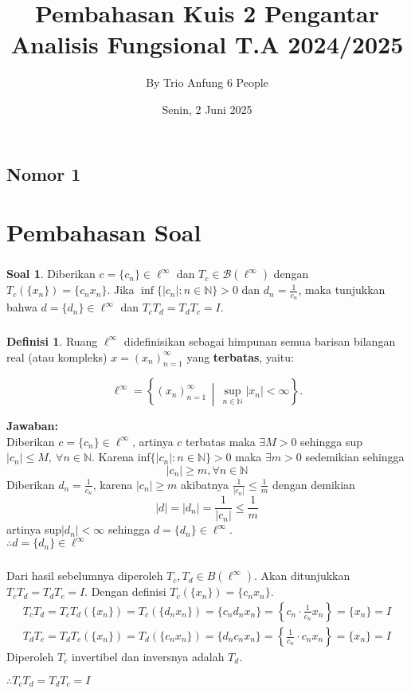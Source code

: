 \documentclass[aspectratio=169]{beamer}
\date{Senin, 2 Juni 2025}
\title[Pengantar Analisis Fungsional]{Pembahasan Kuis 2 Pengantar Analisis Fungsional T.A 2024/2025}
\author[Trio Anfung]{By Trio Anfung 6 People}
\institute[Matematika ITS]{Departemen Matematika\\ Institut Teknologi Sepuluh Nopember}
\theoremstyle{definition}
\newtheorem{definisi}{Definisi}
\newtheorem{soal}{Soal}
\begin{document}
\begin{frame}
  \titlepage
\end{frame}

\subsection{Nomor 1}
\section{Pembahasan Soal}
\begin{frame}
  \frametitle{\insertsection}
  \begin{soal}
    Diberikan $c = \{c_n\} \in \ell^\infty$ dan $T_c \in \mathcal{B}(\ell^\infty)$ dengan $T_c(\{x_n\}) = \{c_n x_n\}$. Jika $\inf\{|c_n| : n \in \mathbb{N}\} > 0$ dan $d_n = \frac{1}{c_n}$, maka tunjukkan bahwa $d = \{d_n\} \in \ell^\infty$ dan $T_c T_d = T_d T_c = I$.
  \end{soal}

\end{frame}


\begin{frame}
  \frametitle{\insertsection}
  \framesubtitle{\insertsubsection}
  \begin{definisi}
    Ruang \( \ell^\infty \) didefinisikan sebagai himpunan semua barisan bilangan real (atau kompleks) \( x = (x_n)_{n=1}^\infty \) yang \textbf{terbatas}, yaitu:

    \[
      \ell^\infty = \left\{ (x_n)_{n=1}^\infty \,\middle|\, \sup_{n \in \mathbb{N}} |x_n| < \infty \right\}.
    \]

  \end{definisi}
  \textbf{Jawaban:}\\
  Diberikan $c = \{c_n\} \in \ell ^\infty$, artinya $c$ terbatas maka  $\exists M>0$ sehingga sup$|c_n| \leq M , \ \forall n \in \mathbb{N}$. Karena inf$\{|c_n| : n \in \mathbb{N}\}>0$ maka $\exists  m>0$ sedemikian sehingga
  \[|c_n| \ge m ,\forall n \in \mathbb{N}\]
  Diberikan $d_n = \frac{1}{c_n}$, karena $|c_n| \ge m$ akibatnya $\frac{1}{|c_n|} \leq \frac{1}{m}$ dengan demikian
  \[|d|  = |d_n|=\frac{1}{|c_n|}\leq \frac{1}{m}\]
  artinya sup$|d_n|<\infty$ sehingga $d=\{d_n\}\in \ell^\infty$.\\

  $\therefore d=\{d_n\}\in \ell^\infty$
\end{frame}

\begin{frame}
  \frametitle{\insertsection}
  \framesubtitle{\insertsubsection}
  Dari hasil sebelumnya diperoleh $T_c,T_d \in B(\ell^\infty)$. Akan ditunjukkan $T_cT_d = T_dT_c = I$. Dengan definisi $T_c(\{x_n\}) = \{c_nx_n\}$.
  \begin{align*}
    T_cT_d = T_cT_d(\{{x_n}\})=T_c(\{d_nx_n\})=\{c_nd_nx_n\}=\left\{c_n\cdot\frac{1}{c_n}x_n\right\}=\{x_n\}=I
    \\
    T_dT_c = T_dT_c(\{{x_n}\})=T_d(\{c_nx_n\})=\{d_nc_nx_n\}=\left\{\frac{1}{c_n}\cdot c_nx_n\right\}=\{x_n\}=I
  \end{align*}
  Diperoleh $T_c$ invertibel dan inversnya adalah $T_d$.

  $\therefore T_cT_d=T_dT_c=I$
\end{frame}
\end{document}
